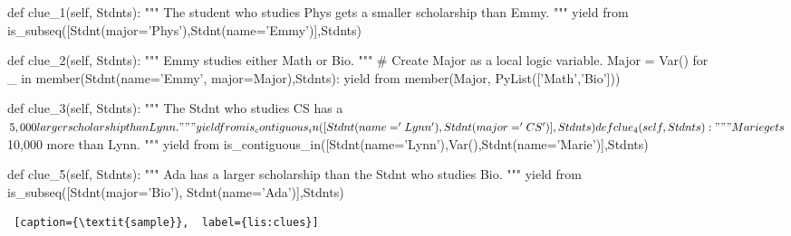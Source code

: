 \begin{figure*}[htb]
\flushright
\begin{minipage}[c]{0.95\textwidth}
\begin{python1}
def clue_1(self, Stdnts):
  """ The student who studies Phys gets a smaller scholarship than Emmy. """
  yield from is_subseq([Stdnt(major='Phys'),Stdnt(name='Emmy')],Stdnts)

def clue_2(self, Stdnts):
  """ Emmy studies either Math or Bio. """
  # Create Major as a local logic variable.
  Major = Var()
  for _ in member(Stdnt(name='Emmy', major=Major),Stdnts):
    yield from member(Major, PyList(['Math','Bio'])) 

def clue_3(self, Stdnts):
  """ The Stdnt who studies CS has a $5,000 larger scholarship than Lynn. """
  yield from is_contiguous_in([Stdnt(name='Lynn'), Stdnt(major='CS')], Stdnts)
  
def clue_4(self, Stdnts):
  """ Marie gets $10,000 more than Lynn. """
  yield from is_contiguous_in([Stdnt(name='Lynn'),Var(),Stdnt(name='Marie')],Stdnts)
  
def clue_5(self, Stdnts):
  """ Ada has a larger scholarship than the Stdnt who studies Bio. """
  yield from is_subseq([Stdnt(major='Bio'), Stdnt(name='Ada')],Stdnts)
\end{python1}\linv
\begin{lstlisting} [caption={\textit{sample}},  label={lis:clues}]
\end{lstlisting}
\end{minipage} \linv
\end{figure*}

